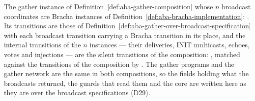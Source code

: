 \begin{definition}
  \label{def:aba-gather-over-bracha}
  \leanok
  The gather instance of Definition~\ref{def:aba-gather-composition} whose $n$ broadcast coordinates are Bracha instances of Definition~\ref{def:aba-bracha-implementation}: .
  Its transitions are those of Definition~\ref{def:aba-gather-over-broadcast-specification} with each broadcast transition carrying a Bracha transition in its place, and the internal transitions of the $n$ instances --- their deliveries, $\mathrm{INIT}$ multicasts, echoes, votes and injections --- are the silent transitions of the composition: , matched against the transitions of the composition by .
  The gather programs and the gather network are the same in both compositions, so the fields holding what the broadcasts returned, the guards that read them and the core are written here as they are over the broadcast specifications (D29).
\end{definition}

